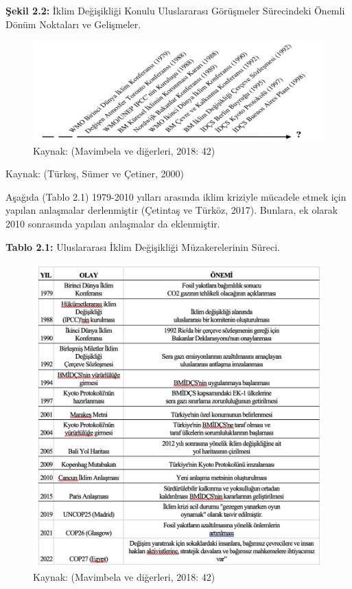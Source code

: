\documentclass[
]{book}
\begin{document}
\textbf{Şekil 2.2:} İklim Değişikliği Konulu Uluslararası Görüşmeler Sürecindeki Önemli Dönüm Noktaları ve Gelişmeler.

\begin{figure}
\includegraphics[width=0.95\linewidth,height=0.95\textheight]{tablolar-sekiller/sekil-2-2} \caption{Kaynak: (Mavimbela ve diğerleri, 2018: 42)}\label{fig:unnamed-chunk-2}
\end{figure}

Kaynak: (Türkeş, Sümer ve Çetiner, 2000)

Aşağıda (Tablo 2.1) 1979-2010 yılları arasında iklim kriziyle mücadele etmek için yapılan anlaşmalar derlenmiştir (Çetintaş ve Türköz, 2017). Bunlara, ek olarak 2010 sonrasında yapılan anlaşmalar da eklenmiştir.

\textbf{Tablo 2.1:} Uluslararası İklim Değişikliği Müzakerelerinin Süreci.

\begin{figure}
\includegraphics[width=0.95\linewidth,height=0.95\textheight]{tablolar-sekiller/tablo-2-1} \caption{Kaynak: (Mavimbela ve diğerleri, 2018: 42)}\label{fig:unnamed-chunk-3}
\end{figure}
\end{document}
